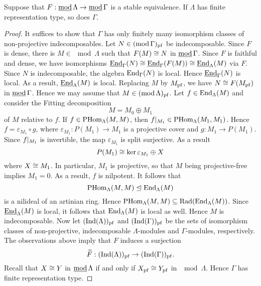 %




\begin{corollary}\label{3.3.2}
  Suppose that $F: \operatorname{\underline{\operatorname{mod}}} \Lambda \to \operatorname{\underline{\operatorname{mod}}} \Gamma$ is a stable equivalence. If $\Lambda$ has
  finite representation type, so does $\Gamma$.
\end{corollary}


\begin{proof}
  It suffices to show that $\Gamma$ has only finitely many isomorphism classes of
  non-projective indecomposables.
  Let $N \in (\operatorname{mod} \Gamma)_{\mathrm{pf}}$ be indecomposable. Since $F$ is dense, there is $M \in \mod
  \Lambda$ such that $F(M) \cong N$ in $\operatorname{\underline{\operatorname{mod}}} \Gamma$. Since $F$ is faithful and dense, we have isomorphisms
  $\operatorname{\underline{\operatorname{End}}}_\Gamma(N) \cong \operatorname{\underline{\operatorname{End}}}_\Gamma(F(M)) \cong \operatorname{\underline{\operatorname{End}}}_\Lambda(M)$ via $F$.
  Since $N$ is indecomposable, the algebra $\operatorname{End}_\Gamma(N)$ is local. Hence
  $\operatorname{\underline{\operatorname{End}}}_\Gamma(N)$ is local. As a result, $\operatorname{\underline{\operatorname{End}}}_\Lambda(M)$ is local.
  Replacing $M$ by $M_{\mathrm{pf}}$, we have $N \cong F(M_{\mathrm{pf}})$ in $\operatorname{\underline{\operatorname{mod}}} \Gamma$. Hence we may
  assume that $M \in (\operatorname{mod} \Lambda)_{\mathrm{pf}}$.
  Let $f \in \operatorname{End}_\Lambda(M)$ and consider the Fitting decomposition
    \[ M = M_0 \oplus M_1 \]
  of $M$ relative to $f$. If $f \in \operatorname{PHom}_\Lambda(M,M)$, then ${f}|_{M_1}
  \in \operatorname{PHom}_\Lambda(M_1, M_1)$. Hence $f = \varepsilon_{M_1} \circ g$, where $\varepsilon_{M_1} :
  P(M_1) \to M_1$ is a projective cover and $g : M_1 \to P(M_1)$. Since
  ${f}|_{M_1}$ is invertible, the map $\varepsilon_{M_1}$ is split surjective.
  As a result
    \[ P(M_1) \cong \ker \varepsilon_{M_1} \oplus X \]
  where $X \cong M_1$. In particular, $M_1$ is projective, so that $M$ being
  projective-free implies $M_1 = 0$. As a result, $f$ is nilpotent. It
  follows that
    \[ \operatorname{PHom}_\Lambda(M,M) \trianglelefteq \operatorname{End}_\Lambda(M) \]
  is a nilideal of an artinian ring. Hence $\operatorname{PHom}_\Lambda(M,M) \subseteq \operatorname{Rad}(\operatorname{End}_\Lambda(M))$.
  Since $\operatorname{\underline{\operatorname{End}}}_\Lambda(M)$ is local, it follows that $\operatorname{End}_\Lambda(M)$ is local as
  well. Hence $M$ is indecomposable.
  Now let $(\mathrm{Ind}(\Lambda))_{\mathrm{pf}}$ and $(\mathrm{Ind}(\Gamma))_{\mathrm{pf}}$ be the sets of isomorphism classes of
  non-projective, indecomposable $\Lambda$-modules and $\Gamma$-modules, respectively. The
  observations above imply that $F$ induces a surjection
    \[ \widetilde F : (\mathrm{Ind}(\Lambda))_{\mathrm{pf}} \to (\mathrm{Ind}(\Gamma))_{\mathrm{pf}}. \]
  Recall that $X \cong Y$ in $\operatorname{\underline{\operatorname{mod}}} \Lambda$ if and only if $X_{\mathrm{pf}} \cong Y_{\mathrm{pf}}$ in $\mod \Lambda$.
  Hence $\Gamma$ has finite representation type.
\end{proof}

